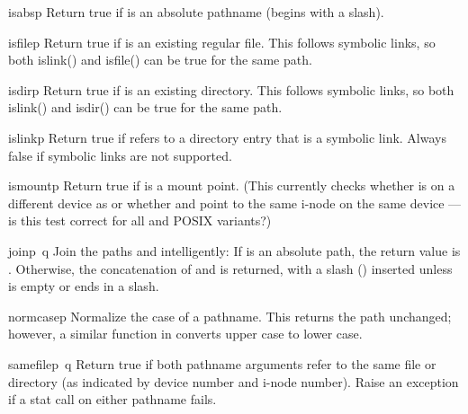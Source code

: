\begin{funcdesc}{isabs}{p}
Return true if  is an absolute pathname (begins with a slash).
\end{funcdesc}

\begin{funcdesc}{isfile}{p}
Return true if  is an existing regular file.  This follows
symbolic links, so both islink() and isfile() can be true for the same
path.
\end{funcdesc}

\begin{funcdesc}{isdir}{p}
Return true if  is an existing directory.  This follows
symbolic links, so both islink() and isdir() can be true for the same
path.
\end{funcdesc}

\begin{funcdesc}{islink}{p}
Return true if
refers to a directory entry that is a symbolic link.
Always false if symbolic links are not supported.
\end{funcdesc}

\begin{funcdesc}{ismount}{p}
Return true if  is a mount point.  (This currently checks whether
 is on a different device as  or whether
 and  point to the same i-node on the same
device --- is this test correct for all \UNIX{} and POSIX variants?)
\end{funcdesc}

\begin{funcdesc}{join}{p\, q}
Join the paths
and
 intelligently:
If
is an absolute path, the return value is
.
Otherwise, the concatenation of
and
is returned, with a slash () inserted unless
is empty or ends in a slash.
\end{funcdesc}

\begin{funcdesc}{normcase}{p}
Normalize the case of a pathname.  This returns the path unchanged;
however, a similar function in  converts upper case to
lower case.
\end{funcdesc}

\begin{funcdesc}{samefile}{p\, q}
Return true if both pathname arguments refer to the same file or directory
(as indicated by device number and i-node number).
Raise an exception if a stat call on either pathname fails.
\end{funcdesc}

